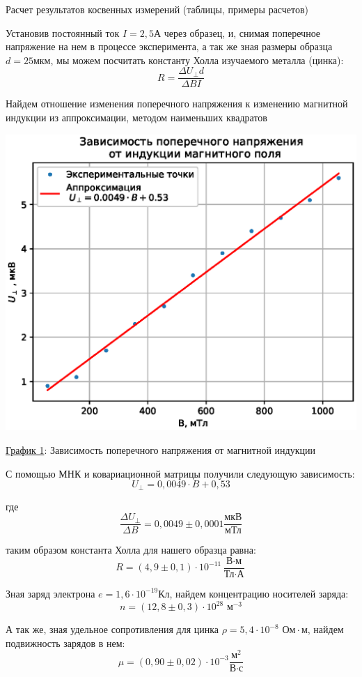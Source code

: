 \documentclass[12pt]{article}
\begin{document}
    \begin{point}{Расчет результатов косвенных измерений (таблицы, примеры расчетов)}
        \par Установив постоянный ток $I = 2,5 \text{А}$ через образец, и, снимая поперечное напряжение на нем в процессе эксперимента,
        а так же зная размеры образца $d = 25 \text{мкм}$, мы можем посчитать константу Холла изучаемого металла (цинка):
        \[R = \frac{\Delta U_{\perp}d}{\Delta B I}\]
        \par
        Найдем отношение изменения поперечного напряжения к изменению магнитной индукции из аппроксимации, методом наименьших квадратов
        \par
        \includegraphics[width=\textwidth]{images/holl.eps}
        \begin{center}
        \underline{График 1}: Зависимость поперечного напряжения от магнитной индукции
        \end{center}
        \par
        С помощью МНК и ковариационной матрицы получили следующую зависимость:
        \[ U_{\perp} = 0,0049 \cdot B + 0,53\]
        \par
        где
        \[\frac{\Delta U_{\perp}}{\Delta B} = 0,0049 \pm 0,0001 \frac{\text{мкВ}}{\text{мТл}}\]
        \par таким образом константа Холла для нашего образца равна:
        \[R = (4,9 \pm 0,1) \cdot 10^{-11} \frac{\text{В} \cdot \text{м}}{\text{Тл} \cdot \text{А}} \]
        \par Зная заряд электрона $e = 1,6 \cdot 10^{-19} \text{Кл}$, найдем концентрацию носителей заряда:
        \[n = (12,8 \pm 0,3) \cdot 10^{28} \text{ м}^{-3} \]
        \par А так же, зная удельное сопротивления для цинка $\rho = 5,4 \cdot 10^{-8} \text{ Ом} \cdot \text{м}$, найдем подвижность зарядов в нем:
        \[\mu = (0,90 \pm 0,02) \cdot 10^{-3} \frac{\text{м}^2}{\text{В} \cdot \text{с}} \]
    \end{point}
\end{document}
